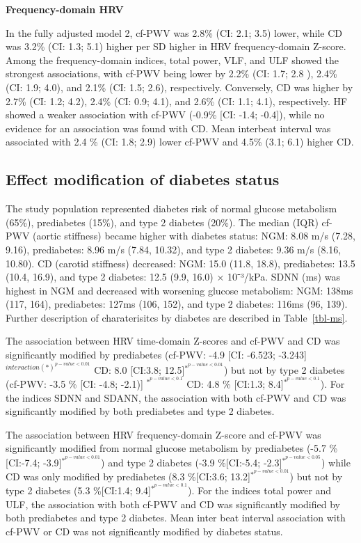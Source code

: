 \documentclass[
  a4paper,
  headsepline=true,
  open=any]{scrbook}
\begin{document}
\textbf{Frequency-domain HRV}

In the fully adjusted model 2, cf-PWV was 2.8\% (CI: 2.1; 3.5) lower,
while CD was 3.2\% (CI: 1.3; 5.1) higher per SD higher in HRV
frequency-domain Z-score. Among the frequency-domain indices, total
power, VLF, and ULF showed the strongest associations, with cf-PWV being
lower by 2.2\% (CI: 1.7; 2.8 ), 2.4\% (CI: 1.9; 4.0), and 2.1\% (CI:
1.5; 2.6), respectively. Conversely, CD was higher by 2.7\% (CI: 1.2;
4.2), 2.4\% (CI: 0.9; 4.1), and 2.6\% (CI: 1.1; 4.1), respectively. HF
showed a weaker association with cf-PWV (-0.9\% {[}CI: -1.4; -0.4{]}),
while no evidence for an association was found with CD. Mean interbeat
interval was associated with 2.4 \% (CI: 1.8; 2.9) lower cf-PWV and
4.5\% (3.1; 6.1) higher CD.

\hypertarget{effect-modification-of-diabetes-status}{%
\subsection{Effect modification of diabetes
status}\label{effect-modification-of-diabetes-status}}

The study population represented diabetes risk of normal glucose
metabolism (65\%), prediabetes (15\%), and type 2 diabetes (20\%). The
median (IQR) cf-PWV (aortic stiffness) became higher with diabetes
status: NGM: 8.08 m/s (7.28, 9.16), prediabetes: 8.96 m/s (7.84, 10.32),
and type 2 diabetes: 9.36 m/s (8.16, 10.80). CD (carotid stiffness)
decreased: NGM: 15.0 (11.8, 18.8), prediabetes: 13.5 (10.4, 16.9), and
type 2 diabetes: 12.5 (9.9, 16.0) × 10⁻³/kPa. SDNN (ms) was highest in
NGM and decreased with worsening glucose metabolism: NGM: 138ms (117,
164), prediabetes: 127ms (106, 152), and type 2 diabetes: 116ms (96,
139). Further description of charaterisitcs by diabetes are described in
Table~\ref{tbl-ms}.

The association between HRV time-domain Z-scores and cf-PWV and CD was
significantly modified by prediabetes (cf-PWV: -4.9 {[}CI: -6.523;
-3.243{]} \(^{interaction(*) ^{p-value< 0.01}}\) CD: 8.0 {[}CI:3.8;
12.5{]}\(^{*^{p-value< 0.01}}\)) but not by type 2 diabetes (cf-PWV:
-3.5 \% {[}CI: -4.8; -2.1){]} \(^{*^{p-value< 0.1}}\) CD: 4.8 \%
{[}CI:1.3; 8.4{]}\(^{*^{p-value< 0.1}}\)). For the indices SDNN and
SDANN, the association with both cf-PWV and CD was significantly
modified by both prediabetes and type 2 diabetes.

The association between HRV frequency-domain Z-score and cf-PWV was
significantly modified from normal glucose metabolism by prediabetes
(-5.7 \%{[}CI:-7.4; -3.9{]}\(^{*^{p-value< 0.01}}\)) and type 2 diabetes
(-3.9 \%{[}CI:-5.4; -2.3{]}\(^{*^{p-value< 0.05}}\)) while CD was only
modified by prediabetes (8.3 \%{[}CI:3.6;
13.2{]}\(^{*^{p-value< 0.01}}\)) but not by type 2 diabetes (5.3
\%{[}CI:1.4; 9.4{]}\(^{*^{p-value< 0.1}}\)). For the indices total power
and ULF, the association with both cf-PWV and CD was significantly
modified by both prediabetes and type 2 diabetes. Mean inter beat
interval association with cf-PWV or CD was not significantly modified by
diabetes status.
\end{document}
